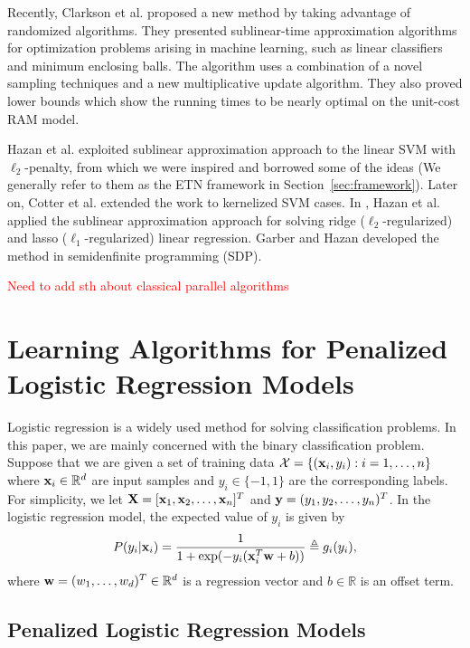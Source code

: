 \documentclass{llncs}
\newcommand{\comment}{\textcolor{red}}
\def\X{{\bf X}}
\def\x{{\bf x}}
\def\y{{\bf y}}
\def\w{{\bf w}}
\def\XM{{\mathcal X}}
\def\RB{{\mathbb R}}
\begin{document}
Recently, Clarkson et al. \cite{clarkson2010sublinear} proposed a new method by taking advantage of randomized algorithms.
They presented sublinear-time approximation algorithms for optimization problems arising in machine learning, such as linear classifiers and minimum enclosing balls.
The algorithm uses a combination of a novel sampling techniques and a new multiplicative update algorithm. They also proved lower bounds which show the running times to be nearly optimal on the unit-cost RAM model.

Hazan et al. \cite{hazanbeating} exploited sublinear approximation approach to the linear SVM with $\ell_2$-penalty, from which we were inspired and borrowed some of the ideas (We generally refer to them as the ETN framework in Section~\ref{sec:framework}).
Later on, Cotter et al. \cite{cotter2012kernelized} extended the work to kernelized SVM cases.
In \cite{hazan2011optimal}, Hazan et al. applied the sublinear approximation approach for solving ridge ($\ell_2$-regularized) and lasso ($\ell_1$-regularized) linear regression.
Garber and Hazan \cite{garberapproximating} developed the method in semidenfinite programming (SDP).

\comment{Need to add sth about classical parallel algorithms}

\section{Learning Algorithms for Penalized Logistic Regression Models} \label{sec:plr}

Logistic regression is a widely used method for solving classification problems.
In this paper, we are mainly concerned with the binary classification problem.  	
Suppose that we are given a set of training data $\XM=\{(\x_i, y_i): i=1, \ldots, n\}$ where $\x_i \in \RB^d$ are input samples and $y_i \in \{-1, 1\}$ are the corresponding labels.
For simplicity, we let $\X=[{\x}_{1}, {\x}_{2}, \ldots, {\x}_n]^{T}$ and $\y=(y_1, y_2, \ldots, y_n)^T$.
In the logistic regression model, the expected value of $y_i$ is given by
\[
P(y_i|\x_i)= \frac{1}{1+ \exp(- y_i(\x_i^T \w + b))} \triangleq g_i(y_i),
\]
where $\w=(w_1, \ldots, w_d)^T \in \RB^d$ is a regression vector and $b\in \RB$ is an offset term.

\subsection{Penalized Logistic Regression Models}
	
\end{document}
